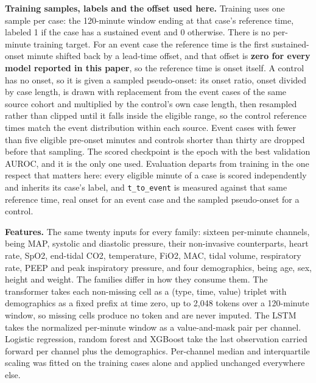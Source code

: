 \textbf{Training samples, labels and the offset used here.} Training uses one sample per case: the
120-minute window ending at that case's reference time, labeled 1 if the case has a sustained
event and 0 otherwise. There is no per-minute training target. For an event case the reference
time is the first sustained-onset minute shifted back by a lead-time offset, and that offset is
\textbf{zero for every model reported in this paper}, so the reference time is onset itself. A control
has no onset, so it is given a sampled pseudo-onset: its onset ratio, onset divided by case
length, is drawn with replacement from the event cases of the same source cohort and multiplied
by the control's own case length, then resampled rather than clipped until it falls inside the
eligible range, so the control reference times match the event distribution within each source.
Event cases with fewer than five eligible pre-onset minutes and controls shorter than thirty are
dropped before that sampling. The scored checkpoint is the epoch with the best validation AUROC,
and it is the only one used. Evaluation departs from training in the one respect that matters
here: every eligible minute of a case is scored independently and inherits its case's label, and
\texttt{t\_\allowbreak{}to\_\allowbreak{}event} is measured against that same reference time, real onset for an event case and the
sampled pseudo-onset for a control.

\textbf{Features.} The same twenty inputs for every family: sixteen per-minute channels, being
MAP, systolic and diastolic pressure, their non-invasive counterparts, heart rate, SpO2,
end-tidal CO2, temperature, FiO2, MAC, tidal volume, respiratory rate, PEEP and peak
inspiratory pressure, and four demographics, being age, sex, height and weight. The families
differ in how they consume them. The transformer takes each non-missing cell as a
(type, time, value) triplet with demographics as a fixed prefix at time zero, up to 2,048
tokens over a 120-minute window, so missing cells produce no token and are never imputed. The
LSTM takes the normalized per-minute window as a value-and-mask pair per channel. Logistic
regression, random forest and XGBoost take the last observation carried forward per channel
plus the demographics. Per-channel median and interquartile scaling was fitted on the
training cases alone and applied unchanged everywhere else.

